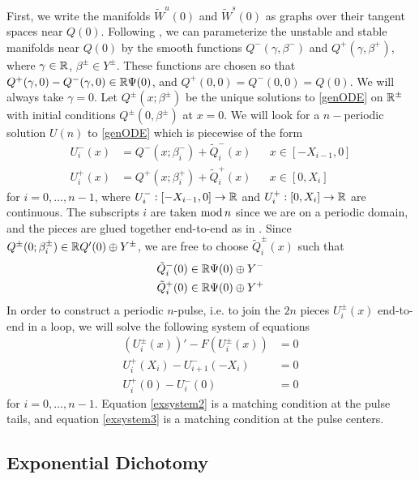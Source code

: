 \documentclass[10pt,reqno]{amsart}
\theoremstyle{plain}
\theoremstyle{definition}
\theoremstyle{remark}
\numberwithin{theorem}{section}
\numberwithin{equation}{section}
\begin{document}
First, we write the manifolds $\tilde{W}^u(0)$ and $\tilde{W}^s(0)$ as graphs over their tangent spaces near $Q(0)$. Following \cite{Sandstede1997}, we can parameterize the unstable and stable manifolds near $Q(0)$ by the smooth functions $Q^-(\gamma, \beta^-)$ and $Q^+(\gamma, \beta^+)$, where $\gamma \in \mathbb{R}$, $\beta^\pm \in Y^\pm$. These functions are chosen so that $Q^+(\gamma, 0) - Q^-(\gamma, 0) \in \mathbb{R} \Psi(0)$, and $Q^+(0, 0) = Q^-(0, 0) = Q(0)$. We will always take $\gamma = 0$. Let $Q^\pm(x; \beta^\pm)$ be the unique solutions to \eqref{genODE} on $\mathbb{R}^\pm$ with initial conditions $Q^\pm(0, \beta^\pm)$ at $x = 0$. We will look for a $n-$periodic solution $U(n)$ to \eqref{genODE} which is piecewise of the form
\begin{equation}\label{Upiecewise}
\begin{aligned}
U_i^-(x) &= Q^-(x; \beta_i^-) + \tilde{Q}_i^-(x) && x \in [-X_{i-1}, 0] \\
U_i^+(x) &= Q^+(x; \beta_i^+) + \tilde{Q}_i^+(x) && x \in [0, X_i]
\end{aligned}
\end{equation}
for $i = 0, \dots, n-1$, where $U_i^-: [-X_{i-1}, 0] \rightarrow \mathbb{R}$ and $U_i^+: [0, X_i] \rightarrow \mathbb{R}$ are continuous. The subscripts $i$ are taken $\mathop\mathrm{mod}\nolimits n$ since we are on a periodic domain, and the pieces are glued together end-to-end as in \cite{Sandstede1998} 
. Since $Q^\pm(0; \beta_i^\pm) \in \mathbb{R} Q'(0) \oplus Y^\pm$, we are free to choose $\tilde{Q}_i^\pm(x)$ such that
\begin{align*}
\tilde{Q}_i^-(0) &\in \mathbb{R} \Psi(0) \oplus Y^- \\
\tilde{Q}_i^+(0) &\in \mathbb{R} \Psi(0) \oplus Y^+
\end{align*}
In order to construct a periodic $n$-pulse, i.e. to join the $2n$ pieces $U_i^\pm(x)$ end-to-end in a loop, we will solve the following system of equations
\begin{align}
(U_i^\pm(x))' - F(U_i^\pm(x)) &= 0 \label{exsystem1} \\
U_i^+(X_i) - U_{i+1}^-(-X_i) &= 0 \label{exsystem2} \\
U_i^+(0) - U_i^-(0) &= 0 \label{exsystem3}
\end{align}
for $i = 0, \dots, n-1$. Equation \cref{exsystem2} is a matching condition at the pulse tails, and equation \cref{exsystem3} is a matching condition at the pulse centers.

\subsection{Exponential Dichotomy}\label{sec:existdichot}
\end{document}
